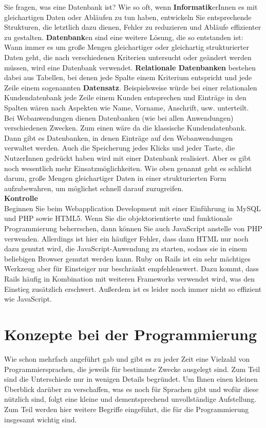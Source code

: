 Sie fragen, was eine Datenbank ist? Wie so oft, wenn \textbf{Informatik}erInnen es mit gleichartigen Daten oder Abläufen zu tun haben, entwickeln Sie entsprechende Strukturen, die letztlich dazu dienen, Fehler zu reduzieren und Abläufe effizienter zu gestalten. \textbf{Datenbank}en sind eine weitere Lösung, die so entstanden ist: Wann immer es um große Mengen gleichartiger oder gleichartig strukturierter Daten geht, die nach verschiedenen Kriterien untersucht oder geändert werden müssen, wird eine Datenbank verwendet. \textbf{Relationale Datenbanken} bestehen dabei aus Tabellen, bei denen jede Spalte einem Kriterium entspricht und jede Zeile einem sogenannten \textbf{Datensatz}. Beispielsweise würde bei einer relationalen Kundendatenbank jede Zeile einem Kunden entsprechen und Einträge in den Spalten wären nach Aspekten wie Name, Vorname, Anschrift, usw. unterteilt.\\

Bei Webanwendungen dienen Datenbanken (wie bei allen Anwendungen) verschiedenen Zwecken. Zum einen wäre da die klassische Kundendatenbank. Dann gibt es Datenbanken, in denen Einträge auf den Webanwendungen verwaltet werden. Auch die Speicherung jedes Klicks und jeder Taste, die NutzerInnen gedrückt haben wird mit einer Datenbank realisiert. Aber es gibt noch wesentlich mehr Einsatzmöglichkeiten. Wie oben genannt geht es schlicht darum, große Mengen gleichartiger Daten in einer strukturierten Form aufzubewahren, um möglichst schnell darauf zuzugreifen.\\

\textbf{Kontrolle}\\
Beginnen Sie beim Webapplication Development mit einer Einführung in MySQL und PHP sowie HTML5. Wenn Sie die objektorientierte und funktionale Programmierung beherrschen, dann können Sie auch JavaScript anstelle von PHP verwenden. Allerdings ist hier ein häufiger Fehler, dass dann HTML nur noch dazu genutzt wird, die JavaScript-Anwendung zu starten, sodass sie in einem beliebigen Browser genutzt werden kann. Ruby on Rails ist ein sehr mächtiges Werkzeug aber für Einsteiger nur beschränkt empfehlenswert. Dazu kommt, dass Rails häufig in Kombination mit weiteren Frameworks verwendet wird, was den Einstieg zusätzlich erschwert. Außerdem ist es leider noch immer nicht so effizient wie JavaScript.

\section{Konzepte bei der Programmierung}
Wie schon mehrfach angeführt gab und gibt es zu jeder Zeit eine Vielzahl von Programmiersprachen, die jeweils für bestimmte Zwecke ausgelegt sind. Zum Teil sind die Unterschiede nur in wenigen Details begründet. Um Ihnen einen kleinen Überblick darüber zu verschaffen, was es noch für Sprachen gibt und wofür diese nützlich sind, folgt eine kleine und dementsprechend unvollständige Aufstellung. Zum Teil werden hier weitere Begriffe eingeführt, die für die Programmierung insgesamt wichtig sind.

